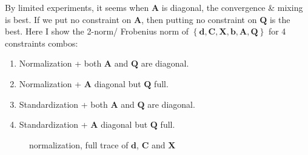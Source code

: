 \documentclass[]{article}
\begin{document}
By limited experiments, it seems when $\bm{A}$ is diagonal, the convergence \& mixing is best. If we put no constraint on $\bm{A}$, then putting no constraint on $\bm{Q}$ is the best. Here I show the 2-norm/ Frobenius norm of \(\left\{ \mathbf{d},\mathbf{C},\mathbf{X},\mathbf{b},\mathbf{A},\mathbf{Q} \right\}\) for 4 constraints combos:
\begin{enumerate}
	\def\labelenumi{(\arabic{enumi})}
	\item
	Normalization + both $\bm{A}$ and $\bm{Q}$ are diagonal.
	\item
	Normalization + $\bm{A}$ diagonal but $\bm{Q}$ full.
	\item
	Standardization + both $\bm{A}$ and $\bm{Q}$ are diagonal.
	\item
	Standardization + $\bm{A}$ diagonal but $\bm{Q}$ full.
\end{enumerate}


\begin{figure}[h!]
	\caption{normalization, full trace of $\bm{d}$, $\bm{C}$ and $\bm{X}$}
	\label{full trace, normal, obs}
\end{figure}
\end{document}
